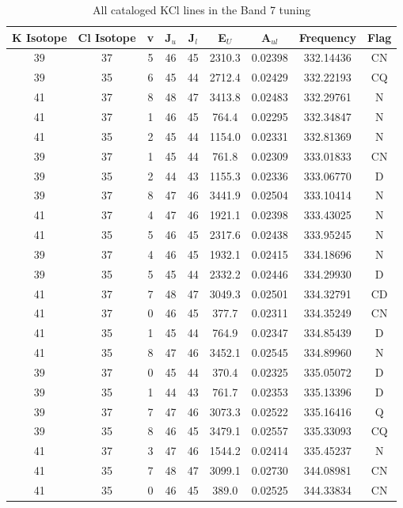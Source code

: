 \begin{table*}[htp]
\centering
\caption{All cataloged KCl lines in the Band 7 tuning}
\begin{tabular}{ccccccccc}
\label{tab:K_detections_B7}
K Isotope & Cl Isotope & v & J$_u$ & J$_l$ & E$_U$ & A$_{ul}$ & Frequency & Flag \\
\hline
39 & 37 & 5 & 46 & 45 & 2310.3 & 0.02398 & 332.14436 & CN \\
39 & 35 & 6 & 45 & 44 & 2712.4 & 0.02429 & 332.22193 & CQ \\
41 & 37 & 8 & 48 & 47 & 3413.8 & 0.02483 & 332.29761 & N \\
41 & 37 & 1 & 46 & 45 & 764.4 & 0.02295 & 332.34847 & N \\
41 & 35 & 2 & 45 & 44 & 1154.0 & 0.02331 & 332.81369 & N \\
39 & 37 & 1 & 45 & 44 & 761.8 & 0.02309 & 333.01833 & CN \\
39 & 35 & 2 & 44 & 43 & 1155.3 & 0.02336 & 333.06770 & D \\
39 & 37 & 8 & 47 & 46 & 3441.9 & 0.02504 & 333.10414 & N \\
41 & 37 & 4 & 47 & 46 & 1921.1 & 0.02398 & 333.43025 & N \\
41 & 35 & 5 & 46 & 45 & 2317.6 & 0.02438 & 333.95245 & N \\
39 & 37 & 4 & 46 & 45 & 1932.1 & 0.02415 & 334.18696 & N \\
39 & 35 & 5 & 45 & 44 & 2332.2 & 0.02446 & 334.29930 & D \\
41 & 37 & 7 & 48 & 47 & 3049.3 & 0.02501 & 334.32791 & CD \\
41 & 37 & 0 & 46 & 45 & 377.7 & 0.02311 & 334.35249 & CN \\
41 & 35 & 1 & 45 & 44 & 764.9 & 0.02347 & 334.85439 & D \\
41 & 35 & 8 & 47 & 46 & 3452.1 & 0.02545 & 334.89960 & N \\
39 & 37 & 0 & 45 & 44 & 370.4 & 0.02325 & 335.05072 & D \\
39 & 35 & 1 & 44 & 43 & 761.7 & 0.02353 & 335.13396 & D \\
39 & 37 & 7 & 47 & 46 & 3073.3 & 0.02522 & 335.16416 & Q \\
39 & 35 & 8 & 46 & 45 & 3479.1 & 0.02557 & 335.33093 & CQ \\
41 & 37 & 3 & 47 & 46 & 1544.2 & 0.02414 & 335.45237 & N \\
41 & 35 & 7 & 48 & 47 & 3099.1 & 0.02730 & 344.08981 & CN \\
41 & 35 & 0 & 46 & 45 & 389.0 & 0.02525 & 344.33834 & CN \\

\end{tabular}
\end{table*}
